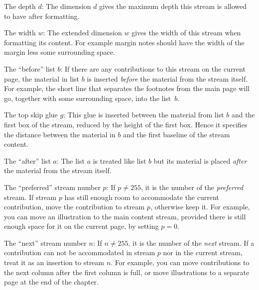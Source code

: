 \item The depth $d$: The dimension $d$ gives the maximum depth this 
stream is allowed to have after formatting.

\item The width $w$: The extended dimension $w$ gives the width of this stream 
when formatting its content. For example margin notes
should have the width of the margin less some surrounding space.

\item The ``before'' list $b$: If there are any contributions to this
stream on the current page, the material in list $b$
is inserted {\it before\/} the material from the stream itself. For
example, the short line that separates the footnotes from the main
page will go, together with some surrounding space, into the list~$b$.

\item The top skip glue $g$: This glue is inserted between the material
from list $b$ and the first box of the stream, reduced
by the height of the first box. Hence it specifies the distance between
the material in $b$ and the first baseline of the stream content.

\item The ``after'' list $a$: The list $a$ is treated like list $b$ but
its material is placed {\it after\/} the  material from the stream itself.

\item The ``preferred'' stream number $p$:  If $p\ne 255$, it is the number of 
the {\it preferred\/} stream. If stream $p$ has still
enough room to accommodate the current contribution, move the
contribution to stream $p$, otherwise keep it.  For example, you can
move an illustration to the main content stream, provided there is
still enough space for it on the current page, by setting $p=0$.

\item The ``next'' stream number $n$: If $n\ne 255$, it is the number of the 
{\it next\/} stream. If a contribution can not be
accommodated in stream $p$ nor in the current stream, treat it as an
insertion to stream $n$.  For example, you can move contributions to
the next column after the first column is full, or move illustrations
to a separate page at the end of the chapter.

